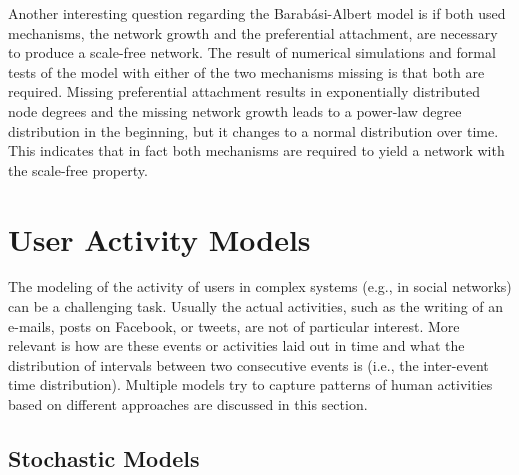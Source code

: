 Another interesting question regarding the Barabási-Albert model is if both used mechanisms, the network growth and the preferential attachment, are necessary to produce a scale-free network.
The result of numerical simulations and formal tests of the model with either of the two mechanisms missing is that both are required.
Missing preferential attachment results in exponentially distributed node degrees and the missing network growth leads to a power-law degree distribution in the beginning, but it changes to a normal distribution over time.
This indicates that in fact both mechanisms are required to yield a network with the scale-free property.




\section{User Activity Models}
\label{sec:user-activity-models}

The modeling of the activity of users in complex systems (e.g., in social networks) can be a challenging task.
Usually the actual activities, such as the writing of an e-mails, posts on  Facebook, or tweets, are not of particular interest.
More relevant is how are these events or activities laid out in time and what  the distribution of intervals between two consecutive events is (i.e., the inter-event time distribution).
Multiple models try to capture patterns of human activities based on different approaches are discussed in this section.

\subsection{Stochastic Models}

